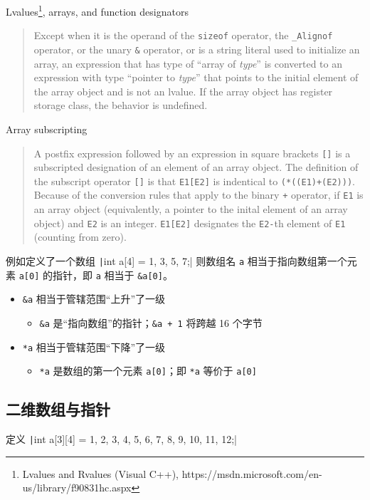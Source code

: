 \documentclass[UTF8]{ctexart}
\begin{document}
Lvalues\footnote{Lvalues and Rvalues (Visual C++), https://msdn.microsoft.com/en-us/library/f90831hc.aspx},
arrays, and function designators
\begin{quote}
    Except when it is the operand of the \texttt{sizeof} operator, the \texttt{\_Alignof} operator,
    or the unary \texttt{\&} operator, or is a string literal used to initialize an array, an
    expression that has type of ``array of \emph{type}'' is converted to an expression with type
    ``pointer to \emph{type}'' that points to the initial element of the array object and is not an
    lvalue. If the array object has register storage class, the behavior is undefined.
\end{quote}

Array subscripting
\begin{quote}
    A postfix expression followed by an expression in square brackets \texttt{[]} is a subscripted
    designation of an element of an array object. The definition of the subscript operator
    \texttt{[]} is that \texttt{E1[E2]} is indentical to \texttt{(*((E1)+(E2)))}. Because of the
    conversion rules that apply to the binary \texttt{+} operator, if \texttt{E1} is an array
    object (equivalently, a pointer to the inital element of an array object) and \texttt{E2} is an
    integer. \texttt{E1[E2]} designates the \texttt{E2-}th element of \texttt{E1} (counting from
    zero).
\end{quote}

例如定义了一个数组 \texttt|int a[4] = {1, 3, 5, 7};| 则数组名 \texttt{a} 相当于指向数组第一个元素
\texttt{a[0]} 的指针，即 \texttt{a} 相当于 \texttt{\&a[0]}。
\begin{itemize}
    \item \texttt{\&a} 相当于管辖范围“上升”了一级
    \begin{itemize}
        \item \texttt{\&a} 是“指向数组”的指针；\texttt{\&a + 1} 将跨越 16 个字节
    \end{itemize}
    \item \texttt{*a} 相当于管辖范围“下降”了一级
    \begin{itemize}
        \item \texttt{*a} 是数组的第一个元素 \texttt{a[0]}；即 \texttt{*a} 等价于 \texttt{a[0]}
    \end{itemize}
\end{itemize}

\subsection{二维数组与指针}
定义 \texttt|int a[3][4] = {{1, 2, 3, 4}, {5, 6, 7, 8}, {9, 10, 11, 12}};|
\end{document}
